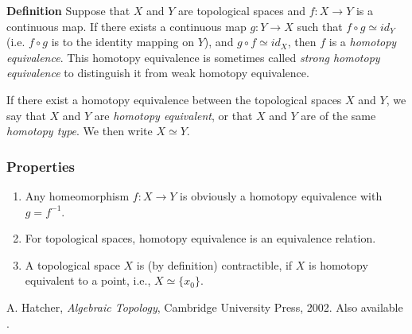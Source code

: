\documentclass[12pt]{article}
\begin{document}
{\bf Definition} Suppose that $X$ and $Y$ are topological spaces and 
$f: X \to Y$ is a continuous map. 
If there exists a 
continuous map $g:Y \to X$ such that $f\circ g \simeq id_{Y}$
(i.e. $f\circ g$ is  to the identity 
mapping on $Y$), 
and $g \circ f \simeq id_{X}$, then 
$f$ is a \emph{homotopy equivalence}.
This homotopy equivalence is sometimes called
\emph{strong homotopy equivalence} to distinguish it from
weak homotopy equivalence.

If there exist a homotopy equivalence between the topological 
spaces $X$ and $Y$, we say that $X$ and $Y$ are  
\emph{homotopy equivalent}, or that 
$X$ and $Y$ are of the same \emph{homotopy type}. 
We then write  $X\simeq Y$. 

\subsubsection{Properties}
\begin{enumerate}
\item Any homeomorphism $f:X\to Y$ is obviously a homotopy equivalence with 
$g=f^{-1}$.
\item For topological spaces, homotopy equivalence is an 
equivalence relation.
\item A topological space $X$ is (by definition) contractible, 
if $X$ is homotopy equivalent to a point, i.e., $X\simeq \{x_0\}$.
\end{enumerate}

\begin{thebibliography}{9}
  A. Hatcher, \emph{Algebraic Topology}, Cambridge University Press, 2002. Also available
 .
 \end{thebibliography}
\end{document}
